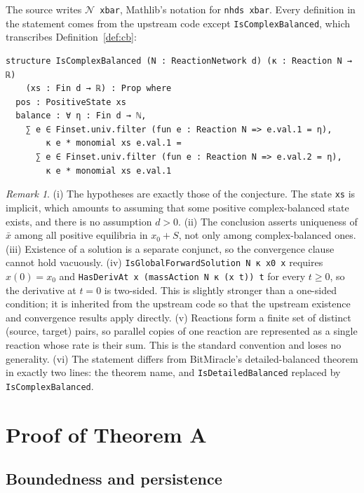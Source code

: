 \documentclass[11pt]{article}
\newcommand{\lean}[1]{\texttt{#1}}
\theoremstyle{plain}
\theoremstyle{definition}
\theoremstyle{remark}
\newtheorem{remark}[theorem]{Remark}
\begin{document}
\noindent The source writes \lean{$\mathcal{N}$ xbar}, Mathlib's notation for \lean{nhds xbar}. Every definition in the statement comes from the upstream code except \lean{IsComplexBalanced}, which transcribes Definition~\ref{def:cb}:

\begin{Verbatim}
structure IsComplexBalanced (N : ReactionNetwork d) (κ : Reaction N → ℝ)
    (xs : Fin d → ℝ) : Prop where
  pos : PositiveState xs
  balance : ∀ η : Fin d → ℕ,
    ∑ e ∈ Finset.univ.filter (fun e : Reaction N => e.val.1 = η),
        κ e * monomial xs e.val.1 =
      ∑ e ∈ Finset.univ.filter (fun e : Reaction N => e.val.2 = η),
        κ e * monomial xs e.val.1
\end{Verbatim}

\begin{remark}\label{rem:statement}
(i) The hypotheses are exactly those of the conjecture. The state \lean{xs} is implicit, which amounts to assuming that some positive complex-balanced state exists, and there is no assumption $d > 0$.
(ii) The conclusion asserts uniqueness of $\bar x$ among all positive equilibria in $x_0 + S$, not only among complex-balanced ones.
(iii) Existence of a solution is a separate conjunct, so the convergence clause cannot hold vacuously.
(iv) \lean{IsGlobalForwardSolution N κ x0 x} requires $x(0) = x_0$ and \lean{HasDerivAt x (massAction N κ (x t)) t} for every $t \ge 0$, so the derivative at $t = 0$ is two-sided. This is slightly stronger than a one-sided condition; it is inherited from the upstream code so that the upstream existence and convergence results apply directly.
(v) Reactions form a finite set of distinct (source, target) pairs, so parallel copies of one reaction are represented as a single reaction whose rate is their sum. This is the standard convention and loses no generality. (vi) The statement differs from BitMiracle's detailed-balanced theorem in exactly two lines: the theorem name, and \lean{IsDetailedBalanced} replaced by \lean{IsComplexBalanced}.
\end{remark}

\section{Proof of Theorem A}\label{sec:proof}

\subsection{Boundedness and persistence}
\end{document}
